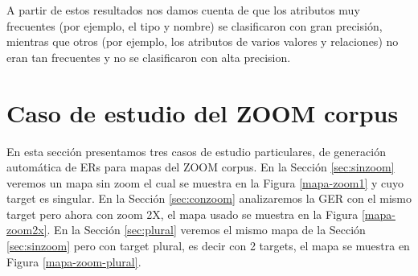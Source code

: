 
A partir de estos resultados nos damos cuenta de que los atributos muy frecuentes (por ejemplo, el tipo y nombre) se clasificaron con gran precisi\'on, mientras que otros (por ejemplo, los atributos de varios valores y relaciones) no eran tan frecuentes y no se clasificaron con alta precision.







\section{Caso de estudio del ZOOM corpus}
\label{sec:caso_estudio}

En esta secci\'on presentamos tres casos de estudio particulares, de generaci\'on autom\'atica de ERs para mapas del ZOOM corpus. En la Secci\'on \ref{sec:sinzoom} veremos un mapa sin zoom el cual se muestra en la Figura \ref{mapa-zoom1} y cuyo target es singular. En la Secci\'on \ref{sec:conzoom} analizaremos la GER con el mismo target pero ahora con zoom 2X, el mapa usado se muestra en la Figura \ref{mapa-zoom2x}. En la Secci\'on \ref{sec:plural} veremos el mismo mapa de la Secci\'on \ref{sec:sinzoom} pero con target plural, es decir con 2 targets, el mapa se muestra en Figura \ref{mapa-zoom-plural}.


%


